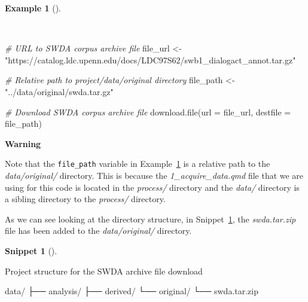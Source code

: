 \documentclass[
  letterpaper,
  krantz1]{latex/krantz-mod}
\newenvironment{Shaded}{\begin{snugshade}}{\end{snugshade}}
\newcommand{\AttributeTok}[1]{\textcolor[rgb]{0.00,0.00,0.00}{#1}}
\newcommand{\CommentTok}[1]{\textcolor[rgb]{0.00,0.00,0.00}{\textit{#1}}}
\newcommand{\ExtensionTok}[1]{\textcolor[rgb]{0.00,0.00,0.00}{#1}}
\newcommand{\FunctionTok}[1]{\textcolor[rgb]{0.00,0.00,0.00}{#1}}
\newcommand{\NormalTok}[1]{\textcolor[rgb]{0.00,0.00,0.00}{#1}}
\newcommand{\OtherTok}[1]{\textcolor[rgb]{0.00,0.00,0.00}{#1}}
\newcommand{\StringTok}[1]{\textcolor[rgb]{0.00,0.00,0.00}{#1}}
\theoremstyle{definition}
\newtheorem{example}{Example}[chapter]
\theoremstyle{definition}
\newtheorem{definition}{Snippet}[chapter]
\theoremstyle{remark}
\begin{document}
\begin{example}[]\protect\hypertarget{exm-acquire-swda-download-file}{}\label{exm-acquire-swda-download-file}

~

\begin{Shaded}
\begin{Highlighting}[numbers=left,,]
\CommentTok{\# URL to SWDA corpus archive file}
\NormalTok{file\_url }\OtherTok{\textless{}{-}}
  \StringTok{"https://catalog.ldc.upenn.edu/docs/LDC97S62/swb1\_dialogact\_annot.tar.gz"}

\CommentTok{\# Relative path to project/data/original directory}
\NormalTok{file\_path }\OtherTok{\textless{}{-}} \StringTok{"../data/original/swda.tar.gz"}

\CommentTok{\# Download SWDA corpus archive file}
\FunctionTok{download.file}\NormalTok{(}\AttributeTok{url =}\NormalTok{ file\_url, }\AttributeTok{destfile =}\NormalTok{ file\_path)}
\end{Highlighting}
\end{Shaded}

\end{example}

\begin{tcolorbox}[enhanced jigsaw, leftrule=.75mm, colframe=quarto-callout-color-frame, left=2mm, colback=white, toprule=.15mm, breakable, arc=.35mm, opacityback=0, bottomrule=.15mm, rightrule=.15mm]

\textbf{ Warning}

Note that the \texttt{file\_path} variable in
Example~\ref{exm-acquire-swda-download-file} is a relative path to the
\emph{data/original/} directory. This is because the
\emph{1\_acquire\_data.qmd} file that we are using for this code is
located in the \emph{process/} directory and the \emph{data/} directory
is a sibling directory to the \emph{process/} directory.

\end{tcolorbox}

As we can see looking at the directory structure, in
Snippet~\ref{def-acquire-swda-download-location}, the
\emph{swda.tar.zip} file has been added to the \emph{data/original/}
directory.

\begin{definition}[]\protect\hypertarget{def-acquire-swda-download-location}{}\label{def-acquire-swda-download-location}

Project structure for the SWDA archive file download

\begin{Shaded}
\begin{Highlighting}[]
\ExtensionTok{data/}
\ExtensionTok{├──}\NormalTok{ analysis/}
\ExtensionTok{├──}\NormalTok{ derived/}
\ExtensionTok{└──}\NormalTok{ original/}
    \ExtensionTok{└──}\NormalTok{ swda.tar.zip}
\end{Highlighting}
\end{Shaded}

\end{definition}
\end{document}
